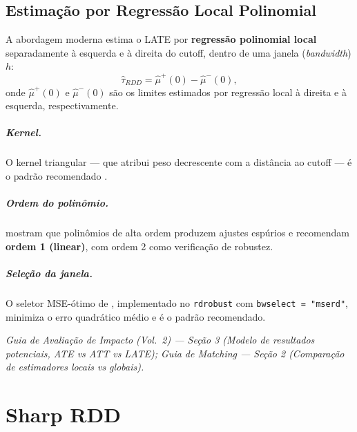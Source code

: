 \documentclass[12pt, a4paper, openany]{book}
\begin{document}
\section{Estima\c{c}\~ao por Regress\~ao Local Polinomial}

A abordagem moderna estima o LATE por \textbf{regress\~ao polinomial local} separadamente \`a esquerda e \`a direita do cutoff, dentro de uma janela (\textit{bandwidth}) $h$:
\begin{equation}
  \hat{\tau}_{RDD} = \hat{\mu}^+(0) - \hat{\mu}^-(0),
\end{equation}
onde $\hat{\mu}^+(0)$ e $\hat{\mu}^-(0)$ s\~ao os limites estimados por regress\~ao local \`a direita e \`a esquerda, respectivamente.

\paragraph{Kernel.} O kernel triangular --- que atribui peso decrescente com a dist\^ancia ao cutoff --- \'e o padr\~ao recomendado \citep{ImbensLemieux2008}.

\paragraph{Ordem do polin\^omio.} \cite{GelmanImbens2019} mostram que polin\^omios de alta ordem produzem ajustes esp\'urios e recomendam \textbf{ordem 1 (linear)}, com ordem 2 como verifica\c{c}\~ao de robustez.

\paragraph{Sele\c{c}\~ao da janela.} O seletor MSE-\'otimo de \cite{Calonico2014}, implementado no \texttt{rdrobust} com \texttt{bwselect = "mserd"}, minimiza o erro quadr\'atico m\'edio e \'e o padr\~ao recomendado.

\begin{conexaobox}
\textit{Guia de Avalia\c{c}\~ao de Impacto (Vol.~2) --- Se\c{c}\~ao 3 (Modelo de resultados potenciais, ATE vs ATT vs LATE); Guia de Matching --- Se\c{c}\~ao 2 (Compara\c{c}\~ao de estimadores locais vs globais).}
\end{conexaobox}


\chapter{Sharp RDD}
\label{sec:sharp}
\end{document}
